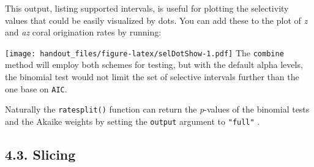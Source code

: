 \documentclass[]{article}
\newenvironment{Shaded}{\begin{snugshade}}{\end{snugshade}}
\newcommand{\CommentTok}[1]{\textcolor[rgb]{0.56,0.35,0.01}{\textit{#1}}}
\newcommand{\ControlFlowTok}[1]{\textcolor[rgb]{0.13,0.29,0.53}{\textbf{#1}}}
\newcommand{\DataTypeTok}[1]{\textcolor[rgb]{0.13,0.29,0.53}{#1}}
\newcommand{\DecValTok}[1]{\textcolor[rgb]{0.00,0.00,0.81}{#1}}
\newcommand{\KeywordTok}[1]{\textcolor[rgb]{0.13,0.29,0.53}{\textbf{#1}}}
\newcommand{\NormalTok}[1]{#1}
\newcommand{\OperatorTok}[1]{\textcolor[rgb]{0.81,0.36,0.00}{\textbf{#1}}}
\newcommand{\StringTok}[1]{\textcolor[rgb]{0.31,0.60,0.02}{#1}}
\begin{document}
This output, listing supported intervals, is useful for plotting the
selectivity values that could be easily visualized by dots. You can add
these to the plot of \emph{z} and \emph{az} coral origination rates by
running:

\begin{Shaded}
\end{Shaded}

\texttt{[image: handout\_files/figure-latex/selDotShow-1.pdf]} The
\texttt{combine} method will employ both schemes for testing, but with
the default alpha levels, the binomial test would not limit the set of
selective intervals further than the one base on \texttt{AIC}.

Naturally the \texttt{ratesplit()} function can return the
\emph{p}-values of the binomial tests and the Akaike weights by setting
the \texttt{output} argument to \texttt{"full"} .

\hypertarget{slicing}{%
\subsection{4.3. Slicing}\label{slicing}}
\end{document}
